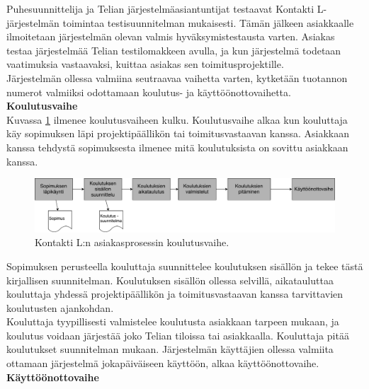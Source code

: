 \documentclass[finnish,12pt,a4paper,pdftex]{article}
\begin{document}
Puhesuunnittelija ja Telian järjestelmäasiantuntijat testaavat Kontakti L-järjestelmän toimintaa testisuunnitelman mukaisesti. Tämän jälkeen asiakkaalle ilmoitetaan järjestelmän olevan valmis hyväksymistestausta varten. Asiakas testaa järjestelmää Telian testilomakkeen avulla, ja kun järjestelmä todetaan vaatimuksia vastaavaksi, kuittaa asiakas sen toimitusprojektille. \\

Järjestelmän ollessa valmiina seutraavaa vaihetta varten, kytketään tuotannon numerot valmiiksi odottamaan koulutus- ja käyttöönottovaihetta.\\

\textbf{Koulutusvaihe}\\


Kuvassa \ref{fig:koulutus} ilmenee koulutusvaiheen kulku. Koulutusvaihe alkaa kun kouluttaja käy sopimuksen läpi projektipäällikön tai toimitusvastaavan kanssa. Asiakkaan kanssa tehdystä sopimuksesta ilmenee mitä koulutuksista on sovittu asiakkaan kanssa.

\begin{figure}[!h]
    \centering
    \includegraphics[scale=0.3]{images/koulutukset.pdf}
    \caption{Kontakti L:n asiakasprosessin koulutusvaihe.}
    \label{fig:koulutus}
\end{figure}

Sopimuksen perusteella kouluttaja suunnittelee koulutuksen sisällön ja tekee tästä kirjallisen suunnitelman. Koulutuksen sisällön ollessa selvillä, aikatauluttaa kouluttaja yhdessä projektipäällikön ja toimitusvastaavan kanssa tarvittavien koulutusten ajankohdan.\\

Kouluttaja tyypillisesti valmistelee koulutusta asiakkaan tarpeen mukaan, ja koulutus voidaan järjestää joko Telian tiloissa tai asiakkaalla. Kouluttaja pitää koulutukset suunnitelman mukaan. Järjestelmän käyttäjien ollessa valmiita ottamaan järjestelmä jokapäiväiseen käyttöön, alkaa käyttöönottovaihe.\\

\textbf{Käyttöönottovaihe}\\
\end{document}
